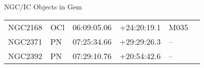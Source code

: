 \begin{block}{NGC/IC Objects in Gem}
  \centering
  \begin{tabularx}{\textwidth}{llrrll} 
    NGC2168 & OCl & 06:09:05.06 & +24:20:19.1  & M035 \\ 
    NGC2371 & PN & 07:25:34.66 & +29:29:26.3  & -- \\ 
    NGC2392 & PN & 07:29:10.76 & +20:54:42.6  & -- \\ 
  \end{tabularx}
\end{block}